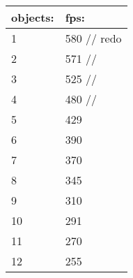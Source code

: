 			\begin{tabular}{|l|l|}
				\hline
				objects: & fps:					\\ \hline
				1				 & 580	// redo \\ \hline
				2				 & 571	//			\\ \hline
				3				 & 525	// 			\\ \hline
				4				 & 480 // 			\\ \hline
				5				 & 429					\\ \hline
				6				 & 390					\\ \hline
				7				 & 370 					\\ \hline
				8				 & 345 					\\ \hline
				9				 & 310 					\\ \hline
				10			 & 291 					\\ \hline
				11			 & 270 					\\ \hline
				12			 & 255 					\\ \hline
			\end{tabular}



		
		
		

